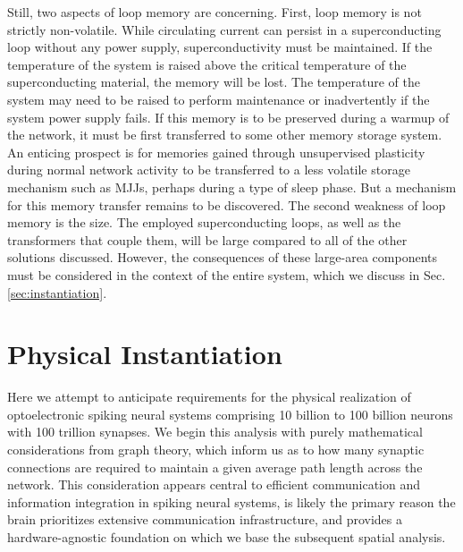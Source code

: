 \documentclass[twocolumn]{article}
\begin{document}
Still, two aspects of loop memory are concerning. First, loop memory is not strictly non-volatile. While circulating current can persist in a superconducting loop without any power supply, superconductivity must be maintained. If the temperature of the system is raised above the critical temperature of the superconducting material, the memory will be lost. The temperature of the system may need to be raised to perform maintenance or inadvertently if the system power supply fails. If this memory is to be preserved during a warmup of the network, it must be first transferred to some other memory storage system. An enticing prospect is for memories gained through unsupervised plasticity during normal network activity to be transferred to a less volatile storage mechanism such as MJJs, perhaps during a type of sleep phase. But a mechanism for this memory transfer remains to be discovered. The second weakness of loop memory is the size. The employed superconducting loops, as well as the transformers that couple them, will be large compared to all of the other solutions discussed. However, the consequences of these large-area components must be considered in the context of the entire system, which we discuss in Sec.\,\ref{sec:instantiation}.


\section{\label{sec:instantiation}Physical Instantiation}
Here we attempt to anticipate requirements for the physical realization of optoelectronic spiking neural systems comprising 10 billion to 100 billion neurons with 100 trillion synapses. We begin this analysis with purely mathematical considerations from graph theory, which inform us as to how many synaptic connections are required to maintain a given average path length across the network. This consideration appears central to efficient communication and information integration in spiking neural systems, is likely the primary reason the brain prioritizes extensive communication infrastructure, and provides a hardware-agnostic foundation on which we base the subsequent spatial analysis.
\end{document}
